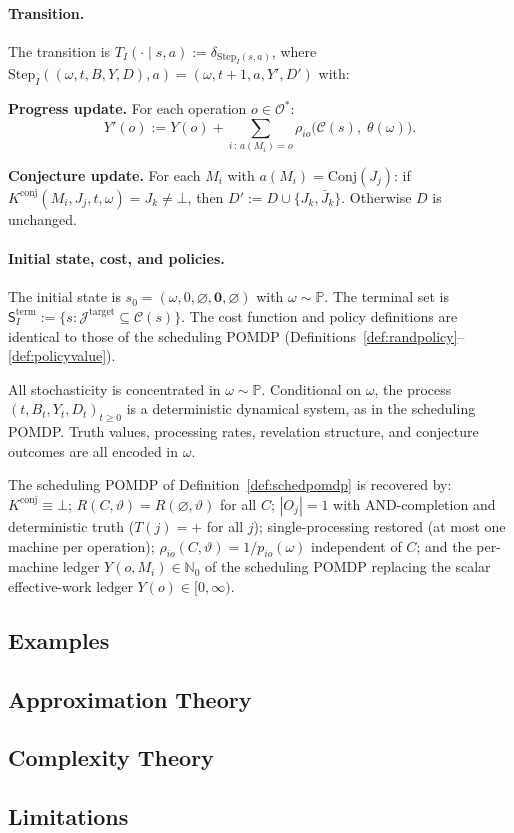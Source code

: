 \paragraph{Transition.} The transition is $T_I(\cdot \mid s, a) :=
\delta_{\mathrm{Step}_I(s, a)}$, where
$\mathrm{Step}_I((\omega, t, B, Y, D), a) = (\omega, t+1, a, Y', D')$ with:

\noindent\textbf{Progress update.} For each operation $o \in \mathcal{O}^*$:
\[
Y'(o) := Y(o) + \sum_{i\,:\, a(M_i) = o}
\rho_{io}\bigl(\mathcal{C}(s),\; \theta(\omega)\bigr).
\]

\medskip
\noindent\textbf{Conjecture update.} For each $M_i$ with
$a(M_i) = \mathrm{Conj}(J_j)$: if
$K^{\mathrm{conj}}(M_i, J_j, t, \omega) = J_k \neq \bot$, then
$D' := D \cup \{J_k, \bar J_k\}$. Otherwise $D$ is unchanged.

\paragraph{Initial state, cost, and policies.}

The initial state is
$s_0 = (\omega, 0, \varnothing, \mathbf{0}, \varnothing)$ with
$\omega \sim \mathbb{P}$. The terminal set is
$\mathsf{S}_I^{\mathrm{term}} := \{s : \mathcal{J}^{\mathrm{target}} \subseteq
\mathcal{C}(s)\}$. The cost function and policy definitions are identical to those of
the scheduling POMDP (Definitions~\ref{def:randpolicy}--\ref{def:policyvalue}).

\begin{remark}
All stochasticity is concentrated in $\omega \sim \mathbb{P}$. Conditional on
$\omega$, the process $(t, B_t, Y_t, D_t)_{t \ge 0}$ is a deterministic dynamical
system, as in the scheduling POMDP. Truth values, processing rates, revelation
structure, and conjecture outcomes are all encoded in $\omega$.
\end{remark}

\begin{remark}
The scheduling POMDP of Definition~\ref{def:schedpomdp} is recovered by:
$K^{\mathrm{conj}} \equiv \bot$;
$R(C, \vartheta) = R(\varnothing, \vartheta)$ for all $C$;
$|O_j| = 1$ with AND-completion and deterministic truth ($T(j) = +$ for all $j$);
single-processing restored (at most one machine per operation);
$\rho_{io}(C, \vartheta) = 1/p_{io}(\omega)$ independent of $C$;
and the per-machine ledger $Y(o, M_i) \in \mathbb{N}_0$ of the scheduling POMDP
replacing the scalar effective-work ledger $Y(o) \in [0, \infty)$.
\end{remark}


\subsection{Examples}


\subsection{Approximation Theory}

\subsection{Complexity Theory}

\subsection{Limitations}


